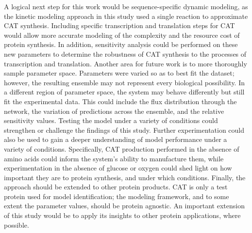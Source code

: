 \documentclass[12pt]{article}
\begin{document}

A logical next step for this work would be sequence-specific dynamic modeling, as the kinetic modeling approach in this study used a single reaction to approximate CAT synthesis.
Including specific transcription and translation steps for CAT would allow more accurate modeling of the complexity and the resource cost of protein synthesis.
In addition, sensitivity analysis could be performed on these new parameters to determine the robustness of CAT synthesis to the processes of transcription and translation.
Another area for future work is to more thoroughly sample parameter space.
Parameters were varied so as to best fit the dataset; however, the resulting ensemble may not represent every biological possibility.
In a different region of parameter space, the system may behave differently but still fit the experimental data.
This could include the flux distribution through the network, the variation of predictions across the ensemble, and the relative sensitivity values.
Testing the model under a variety of conditions could strengthen or challenge the findings of this study.
Further experimentation could also be used to gain a deeper understanding of model performance under a variety of conditions.
Specifically, CAT production performed in the absence of amino acids could inform the system's ability to manufacture them, while experimentation in the absence of glucose or oxygen could shed light on how important they are to protein synthesis, and under which conditions.
Finally, the approach should be extended to other protein products.
CAT is only a test protein used for model identification; the modeling framework, and to some extent the parameter values, should be protein agnostic.
An important extension of this study would be to apply its insights to other protein applications, where possible.
\end{document}
